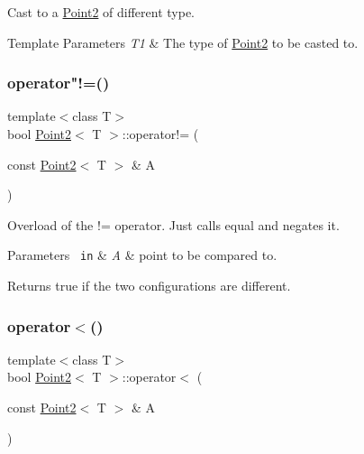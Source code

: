 Cast to a \mbox{\hyperlink{class_point2}{Point2}} of different type. 


\begin{DoxyTemplParams}{Template Parameters}
{\em T1} & The type of {\ttfamily \mbox{\hyperlink{class_point2}{Point2}}} to be casted to. \\
\hline
\end{DoxyTemplParams}
\mbox{\label{class_point2_ad671e757853f5d7d5431d011d9e94b03}} 
\subsubsection{\texorpdfstring{operator"!=()}{operator!=()}}
{\footnotesize\ttfamily template$<$class T$>$ \\
bool \mbox{\hyperlink{class_point2}{Point2}}$<$ T $>$\+::operator!= (\begin{DoxyParamCaption}\item[{const \mbox{\hyperlink{class_point2}{Point2}}$<$ T $>$ \&}]{A }\end{DoxyParamCaption})\hspace{0.3cm}{\ttfamily [inline]}}



Overload of the != operator. Just calls {\ttfamily equal} and negates it. 


\begin{DoxyParams}[1]{Parameters}
\mbox{\texttt{ in}}  & {\em A} & point to be compared to. \\
\hline
\end{DoxyParams}
\begin{DoxyReturn}{Returns}
true if the two configurations are different. 
\end{DoxyReturn}
\mbox{\label{class_point2_a636a84c47519a482cfce43039e981dff}} 
\subsubsection{\texorpdfstring{operator$<$()}{operator<()}}
{\footnotesize\ttfamily template$<$class T$>$ \\
bool \mbox{\hyperlink{class_point2}{Point2}}$<$ T $>$\+::operator$<$ (\begin{DoxyParamCaption}\item[{const \mbox{\hyperlink{class_point2}{Point2}}$<$ T $>$ \&}]{A }\end{DoxyParamCaption})\hspace{0.3cm}{\ttfamily [inline]}}



